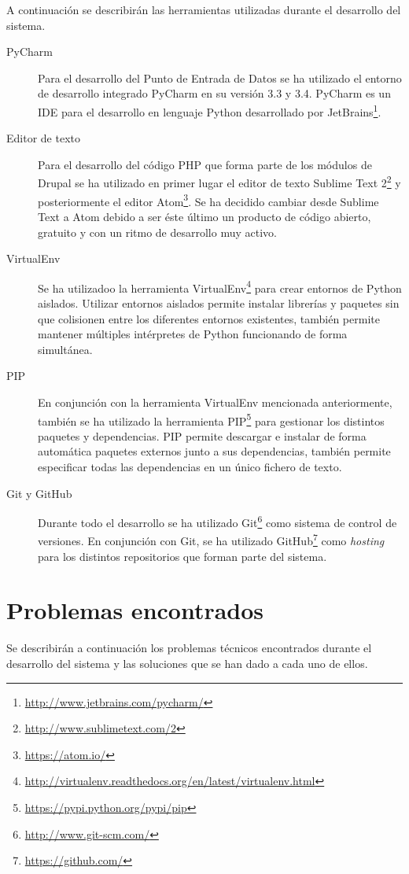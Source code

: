 A continuación se describirán las herramientas utilizadas durante el desarrollo del sistema.
\begin{description}
	\item[PyCharm]
		Para el desarrollo del Punto de Entrada de Datos se ha utilizado el entorno de desarrollo integrado PyCharm en su versión 3.3 y 3.4.  PyCharm es un IDE para el desarrollo en lenguaje Python desarrollado por JetBrains\footnote{\url{http://www.jetbrains.com/pycharm/}}.
	\item[Editor de texto]
		Para el desarrollo del código PHP que forma parte de los módulos de Drupal se ha utilizado en primer lugar el editor de texto Sublime Text 2\footnote{\url{http://www.sublimetext.com/2}} y posteriormente el editor Atom\footnote{\url{https://atom.io/}}.  Se ha decidido cambiar desde Sublime Text a Atom debido a ser éste último un producto de código abierto, gratuito y con un ritmo de desarrollo muy activo.
	\item[VirtualEnv]
		Se ha utilizadoo la herramienta VirtualEnv\footnote{\url{http://virtualenv.readthedocs.org/en/latest/virtualenv.html}} para crear entornos de Python aislados.  Utilizar entornos aislados permite instalar librerías y paquetes sin que colisionen entre los diferentes entornos existentes, también permite mantener múltiples intérpretes de Python funcionando de forma simultánea.
	\item[PIP]
		En conjunción con la herramienta VirtualEnv mencionada anteriormente, también se ha utilizado la herramienta PIP\footnote{\url{https://pypi.python.org/pypi/pip}} para gestionar los distintos paquetes y dependencias.  PIP permite descargar e instalar de forma automática paquetes externos junto a sus dependencias, también permite especificar todas las dependencias en un único fichero de texto.
	\item[Git y GitHub]
		Durante todo el desarrollo se ha utilizado Git\footnote{\url{http://www.git-scm.com/}} como sistema de control de versiones.  En conjunción con Git, se ha utilizado GitHub\footnote{\url{https://github.com/}} como \textit{hosting} para los distintos repositorios que forman parte del sistema.
\end{description}


\section{Problemas encontrados}
\label{implementacion:problemas_encontrados}
	
	Se describirán a continuación los problemas técnicos encontrados durante el desarrollo del sistema y las soluciones que se han dado a cada uno de ellos.
	
